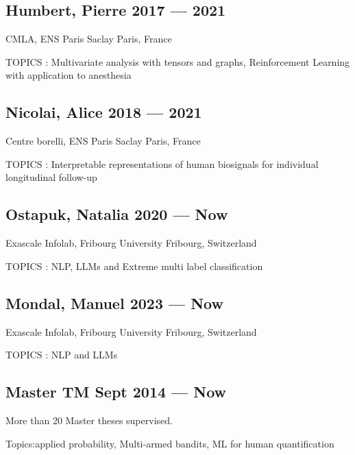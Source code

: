 

\subsection{Humbert, Pierre  \hfill  2017 --- 2021}
\begin{zitemize}
\item{CMLA, ENS Paris Saclay \hfill Paris, France }
\item{TOPICS : Multivariate analysis with tensors and graphs, Reinforcement Learning with application to anesthesia}
\end{zitemize}


\subsection{Nicolai, Alice  \hfill  2018 --- 2021}
\begin{zitemize}
\item{Centre borelli, ENS Paris Saclay \hfill Paris, France }
\item{TOPICS : Interpretable representations of human biosignals for individual longitudinal follow-up}
\end{zitemize}

\subsection{Ostapuk, Natalia  \hfill  2020 --- Now}
\begin{zitemize}
\item{Exascale Infolab, Fribourg University \hfill Fribourg, Switzerland }
\item{TOPICS : NLP, LLMs and Extreme multi label classification}
\end{zitemize}

\subsection{Mondal, Manuel  \hfill  2023 --- Now}
\begin{zitemize}
	\item{Exascale Infolab, Fribourg University \hfill Fribourg, Switzerland }
	\item{TOPICS : NLP and LLMs}
\end{zitemize}

\subsection{{Master TM \hfill Sept 2014  --- Now}}
\begin{zitemize}
\item{More than 20 Master theses supervised.}
\item{Topics:applied probability, Multi-armed bandits, ML for human quantification}
\end{zitemize}



